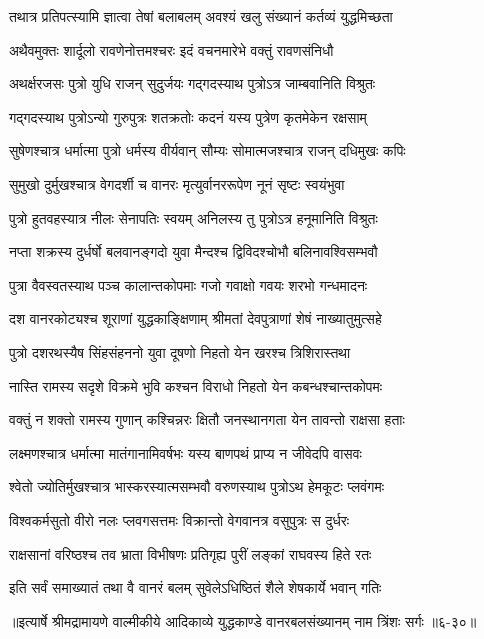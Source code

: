 \twolineshloka
{तथात्र प्रतिपत्स्यामि ज्ञात्वा तेषां बलाबलम्}
{अवश्यं खलु संख्यानं कर्तव्यं युद्धमिच्छता} %

\twolineshloka
{अथैवमुक्तः शार्दूलो रावणेनोत्तमश्चरः}
{इदं वचनमारेभे वक्तुं रावणसंनिधौ} %

\twolineshloka
{अथर्क्षरजसः पुत्रो युधि राजन् सुदुर्जयः}
{गद्गदस्याथ पुत्रोऽत्र जाम्बवानिति विश्रुतः} %

\twolineshloka
{गद्गदस्याथ पुत्रोऽन्यो गुरुपुत्रः शतक्रतोः}
{कदनं यस्य पुत्रेण कृतमेकेन रक्षसाम्} %

\twolineshloka
{सुषेणश्चात्र धर्मात्मा पुत्रो धर्मस्य वीर्यवान्}
{सौम्यः सोमात्मजश्चात्र राजन् दधिमुखः कपिः} %

\twolineshloka
{सुमुखो दुर्मुखश्चात्र वेगदर्शी च वानरः}
{मृत्युर्वानररूपेण नूनं सृष्टः स्वयंभुवा} %

\twolineshloka
{पुत्रो हुतवहस्यात्र नीलः सेनापतिः स्वयम्}
{अनिलस्य तु पुत्रोऽत्र हनूमानिति विश्रुतः} %

\twolineshloka
{नप्ता शक्रस्य दुर्धर्षो बलवानङ्गदो युवा}
{मैन्दश्च द्विविदश्चोभौ बलिनावश्विसम्भवौ} %

\twolineshloka
{पुत्रा वैवस्वतस्याथ पञ्च कालान्तकोपमाः}
{गजो गवाक्षो गवयः शरभो गन्धमादनः} %

\twolineshloka
{दश वानरकोट्यश्च शूराणां युद्धकाङ्क्षिणाम्}
{श्रीमतां देवपुत्राणां शेषं नाख्यातुमुत्सहे} %

\twolineshloka
{पुत्रो दशरथस्यैष सिंहसंहननो युवा}
{दूषणो निहतो येन खरश्च त्रिशिरास्तथा} %

\twolineshloka
{नास्ति रामस्य सदृशे विक्रमे भुवि कश्चन}
{विराधो निहतो येन कबन्धश्चान्तकोपमः} %

\twolineshloka
{वक्तुं न शक्तो रामस्य गुणान् कश्चिन्नरः क्षितौ}
{जनस्थानगता येन तावन्तो राक्षसा हताः} %

\twolineshloka
{लक्ष्मणश्चात्र धर्मात्मा मातंगानामिवर्षभः}
{यस्य बाणपथं प्राप्य न जीवेदपि वासवः} %

\twolineshloka
{श्वेतो ज्योतिर्मुखश्चात्र भास्करस्यात्मसम्भवौ}
{वरुणस्याथ पुत्रोऽथ हेमकूटः प्लवंगमः} %

\twolineshloka
{विश्वकर्मसुतो वीरो नलः प्लवगसत्तमः}
{विक्रान्तो वेगवानत्र वसुपुत्रः स दुर्धरः} %

\twolineshloka
{राक्षसानां वरिष्ठश्च तव भ्राता विभीषणः}
{प्रतिगृह्य पुरीं लङ्कां राघवस्य हिते रतः} %

\twolineshloka
{इति सर्वं समाख्यातं तथा वै वानरं बलम्}
{सुवेलेऽधिष्ठितं शैले शेषकार्ये भवान् गतिः} %


॥इत्यार्षे श्रीमद्रामायणे वाल्मीकीये आदिकाव्ये युद्धकाण्डे वानरबलसंख्यानम् नाम त्रिंशः सर्गः ॥६-३०॥
